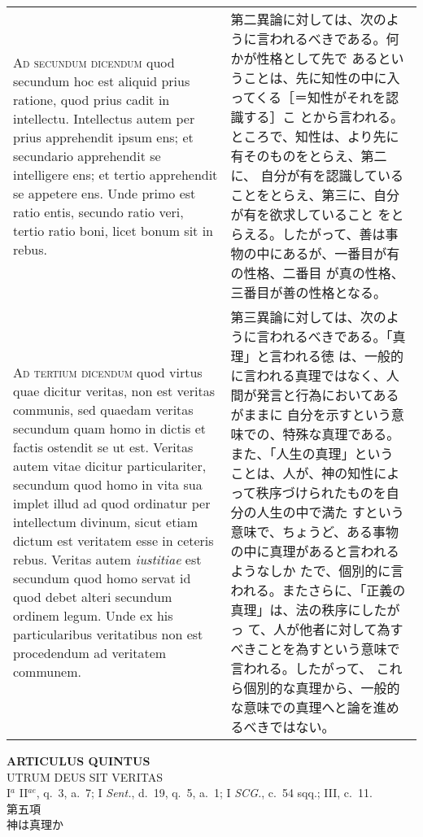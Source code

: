 \documentclass[10pt]{jsarticle} %
\begin{document}
\begin{longtable}{p{21em}p{21em}}
\\

{\scshape Ad secundum dicendum} quod secundum hoc est aliquid prius
ratione, quod prius cadit in intellectu. Intellectus autem per prius
apprehendit ipsum ens; et secundario apprehendit se intelligere ens;
et tertio apprehendit se appetere ens. Unde primo est ratio entis,
secundo ratio veri, tertio ratio boni, licet bonum sit in rebus.

&

第二異論に対しては、次のように言われるべきである。何かが性格として先で
あるということは、先に知性の中に入ってくる［＝知性がそれを認識する］こ
とから言われる。ところで、知性は、より先に有そのものをとらえ、第二に、
自分が有を認識していることをとらえ、第三に、自分が有を欲求していること
をとらえる。したがって、善は事物の中にあるが、一番目が有の性格、二番目
が真の性格、三番目が善の性格となる。

\\


{\scshape Ad tertium dicendum} quod virtus quae dicitur veritas, non
est veritas communis, sed quaedam veritas secundum quam homo in dictis
et factis ostendit se ut est. Veritas autem vitae dicitur
particulariter, secundum quod homo in vita sua implet illud ad quod
ordinatur per intellectum divinum, sicut etiam dictum est veritatem
esse in ceteris rebus. Veritas autem {\itshape iustitiae} est secundum
quod homo servat id quod debet alteri secundum ordinem legum. Unde ex
his particularibus veritatibus non est procedendum ad veritatem
communem.

&

第三異論に対しては、次のように言われるべきである。「真理」と言われる徳
は、一般的に言われる真理ではなく、人間が発言と行為においてあるがままに
自分を示すという意味での、特殊な真理である。また、「人生の真理」という
ことは、人が、神の知性によって秩序づけられたものを自分の人生の中で満た
すという意味で、ちょうど、ある事物の中に真理があると言われるようなしか
たで、個別的に言われる。またさらに、「正義の真理」は、法の秩序にしたがっ
て、人が他者に対して為すべきことを為すという意味で言われる。したがって、
これら個別的な真理から、一般的な意味での真理へと論を進めるべきではない。
\end{longtable}
\newpage


\begin{center}
 {\Large {\bf ARTICULUS QUINTUS}}\\
 {\large UTRUM DEUS SIT VERITAS}\\
 {\footnotesize I$^a$ II$^{ae}$, q.~3, a.~7; I {\itshape Sent.}, d.~19,
 q.~5, a.~1; I {\itshape SCG.}, c.~54 sqq.; III, c.~11.}\\
 {\Large 第五項\\神は真理か}
\end{center}
\end{document}
